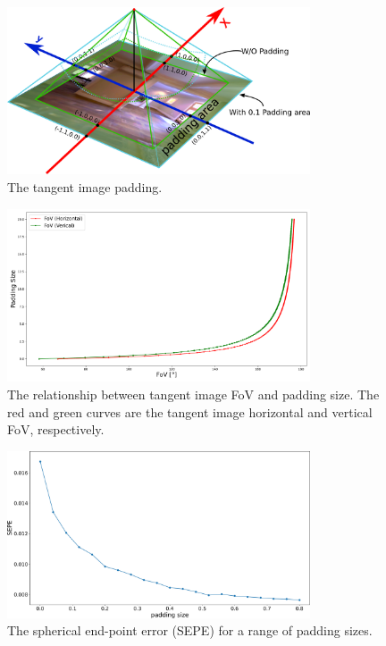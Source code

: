 \documentclass{bmvc2k}
\begin{document}
\begin{figure}[hbt!]
	\centering
	\includegraphics[width=0.80\textwidth]{images/tangent_image/tangent_image_padding.pdf}
	\caption{\label{fig:sup:howtopadding}%
		The tangent image padding.}
\end{figure}

\begin{figure}[hbt!]
	\centering
	\includegraphics[width=0.80\textwidth]{images/paddingsize_vs_fov.pdf}
	\caption{\label{fig:sup:paddingvsfov}%
		The relationship between tangent image FoV and padding size. The red and green curves are the tangent image horizontal and vertical FoV, respectively.}
\end{figure}

\begin{figure}[hbt!]
	\centering
	\includegraphics[width=0.80\textwidth]{images/abla_padding.pdf}
	\caption{\label{fig:sup:ablationpadding}%
		The spherical end-point error (SEPE) for a range of padding sizes.}
\end{figure}
\end{document}

